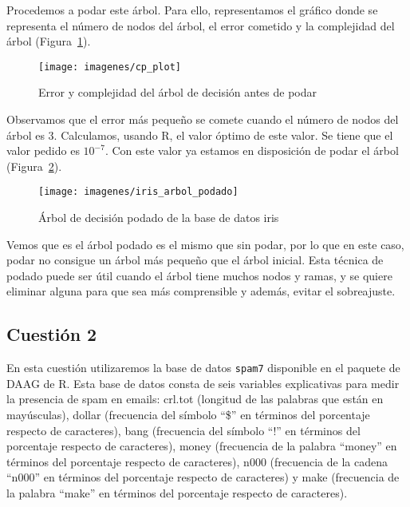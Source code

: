 \documentclass[12pt,a4paper,twoside,openright,titlepage,final]{article}
\begin{document}
Procedemos a podar este árbol. Para ello, representamos el gráfico donde se representa el número de nodos del árbol, el error cometido y la complejidad del árbol (Figura~\ref{fig:cp_plot}).\\

\begin{figure}[tbph!]
\centering
\texttt{[image: imagenes/cp\_plot]}
\caption{Error y complejidad del árbol de decisión antes de podar}
\label{fig:cp_plot}
\end{figure}

Observamos que el error más pequeño se comete cuando el número de nodos del árbol es 3. Calculamos, usando R, el valor óptimo de este valor. Se tiene que el valor pedido es $10^{-7}$. Con este valor ya estamos en disposición de podar el árbol (Figura~\ref{fig:iris_arbol_podado}).\\

\begin{figure}[tbph!]
\centering
\texttt{[image: imagenes/iris\_arbol\_podado]}
\caption{Árbol de decisión podado de la base de datos iris}
\label{fig:iris_arbol_podado}
\end{figure}

Vemos que es el árbol podado es el mismo que sin podar, por lo que en este caso, podar no consigue un árbol más pequeño que el árbol inicial. Esta técnica de podado puede ser útil cuando el árbol tiene muchos nodos y ramas, y se quiere eliminar alguna para que sea más comprensible y además, evitar el sobreajuste. 

\subsection{Cuestión 2}

En esta cuestión utilizaremos la base de datos \texttt{spam7} disponible en el paquete de DAAG de R. Esta base de datos consta de seis variables explicativas para medir la presencia de spam en emails: crl.tot (longitud de las palabras que están en mayúsculas), dollar (frecuencia del símbolo ``\$'' en términos del porcentaje respecto de caracteres), bang (frecuencia del símbolo ``!'' en términos del porcentaje respecto de caracteres), money (frecuencia de la palabra ``money'' en términos del porcentaje respecto de caracteres), n000 (frecuencia de la cadena ``n000'' en términos del porcentaje respecto de caracteres) y make (frecuencia de la palabra ``make'' en términos del porcentaje respecto de caracteres).\\
\end{document}
